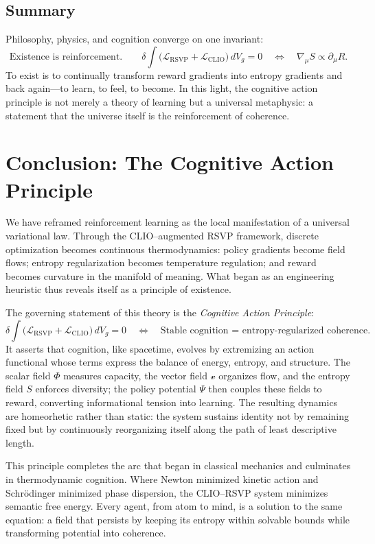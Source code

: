 \documentclass[11pt]{article}
\begin{document}
\subsection{Summary}

Philosophy, physics, and cognition converge on one invariant:
\[
\boxed{
\text{Existence is reinforcement.}
\qquad
\delta\!\int\!(\mathcal{L}_{\mathrm{RSVP}}+\mathcal{L}_{\mathrm{CLIO}}\big)\,dV_g = 0
\quad\Longleftrightarrow\quad
\nabla_\mu S \propto \partial_\mu R.
}
\]
To exist is to continually transform reward gradients into entropy gradients and back again—to learn, to feel, to become.  
In this light, the cognitive action principle is not merely a theory of learning but a universal metaphysic:  
a statement that the universe itself is the reinforcement of coherence.

\section{Conclusion: The Cognitive Action Principle}
We have reframed reinforcement learning as the local manifestation of a universal variational law.  
Through the CLIO–augmented RSVP framework, discrete optimization becomes continuous thermodynamics:  
policy gradients become field flows;  
entropy regularization becomes temperature regulation;  
and reward becomes curvature in the manifold of meaning.  
What began as an engineering heuristic thus reveals itself as a principle of existence.

The governing statement of this theory is the \emph{Cognitive Action Principle}:
\[
\boxed{
\delta\!\int\!\big(\mathcal{L}_{\mathrm{RSVP}}+\mathcal{L}_{\mathrm{CLIO}}\big)\,dV_g = 0
\quad\Longleftrightarrow\quad
\text{Stable cognition = entropy-regularized coherence.}
}
\]
It asserts that cognition, like spacetime, evolves by extremizing an action functional whose terms express the balance of energy, entropy, and structure.  
The scalar field $\Phi$ measures capacity, the vector field $\mathcal{v}$ organizes flow, and the entropy field $S$ enforces diversity;  
the policy potential $\Psi$ then couples these fields to reward, converting informational tension into learning.  
The resulting dynamics are homeorhetic rather than static: the system sustains identity not by remaining fixed but by continuously reorganizing itself along the path of least descriptive length.

This principle completes the arc that began in classical mechanics and culminates in thermodynamic cognition.  
Where Newton minimized kinetic action and Schrödinger minimized phase dispersion, the CLIO–RSVP system minimizes semantic free energy.  
Every agent, from atom to mind, is a solution to the same equation: a field that persists by keeping its entropy within solvable bounds while transforming potential into coherence.
\end{document}
